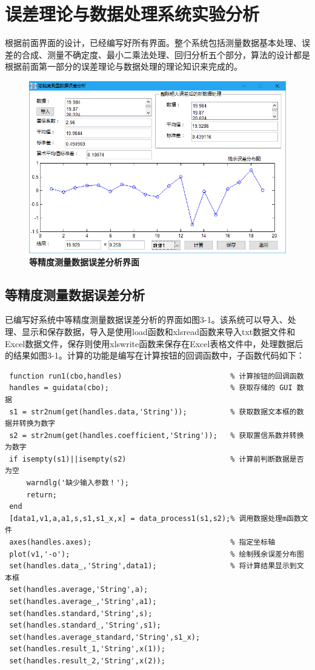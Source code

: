 \setcounter{figure}{0}
\setcounter{table}{0}
\setcounter{equation}{0}
\section{误差理论与数据处理系统实验分析}
根据前面界面的设计，已经编写好所有界面。整个系统包括测量数据基本处理、误差的合成、测量不确定度、最小二乘法处理、回归分析五个部分，算法的设计都是根据前面第一部分的误差理论与数据处理的理论知识来完成的。
\begin{figure}[H]
	\centering
	\includegraphics[scale=0.5]{subsubpage1_1}
	\caption{\textbf{等精度测量数据误差分析界面}}
\end{figure}
\subsection{等精度测量数据误差分析}
已编写好系统中等精度测量数据误差分析的界面如图3-1。该系统可以导入、处理、显示和保存数据，导入是使用load函数和xlsread函数来导入txt数据文件和Excel数据文件，保存则使用xlswrite函数来保存在Excel表格文件中，处理数据后的结果如图3-1。计算的功能是编写在计算按钮的回调函数中，子函数代码如下：
\begin{lstlisting}
 function run1(cbo,handles)							% 计算按钮的回调函数
 handles = guidata(cbo);							% 获取存储的 GUI 数据
 s1 = str2num(get(handles.data,'String'));			% 获取数据文本框的数据并转换为数字
 s2 = str2num(get(handles.coefficient,'String'));	% 获取置信系数并转换为数字
 if isempty(s1)||isempty(s2)						% 计算前判断数据是否为空
	 warndlg('缺少输入参数！');
	 return;
 end
 [data1,v1,a,a1,s,s1,s1_x,x] = data_process1(s1,s2);% 调用数据处理m函数文件
 axes(handles.axes);								% 指定坐标轴
 plot(v1,'-o');										% 绘制残余误差分布图
 set(handles.data_,'String',data1);					% 将计算结果显示到文本框
 set(handles.average,'String',a);
 set(handles.average_,'String',a1);
 set(handles.standard,'String',s);
 set(handles.standard_,'String',s1);
 set(handles.average_standard,'String',s1_x);
 set(handles.result_1,'String',x(1));
 set(handles.result_2,'String',x(2));\end{lstlisting}
 
